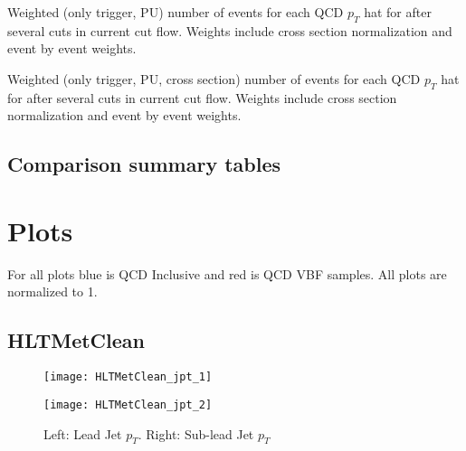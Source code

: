 \documentclass[a4paper,10pt]{article}
\begin{document}
\begin{table}[!h]
\centering
\resizebox{\linewidth}{!}{}
\caption{Weighted (only trigger, PU) number of events for each QCD $p_T$ hat for after several cuts in current cut flow. Weights include cross section normalization and event by event weights.}
\end{table}

\begin{table}[!h]
\centering
\resizebox{\linewidth}{!}{}
\caption{Weighted (only trigger, PU, cross section) number of events for each QCD $p_T$ hat for after several cuts in current cut flow. Weights include cross section normalization and event by event weights.}
\end{table}

\subsection{Comparison summary tables}

\begin{table}[!h]
\centering
\resizebox{\linewidth}{!}{}
\caption{}
\end{table}

\begin{table}[!h]
\centering
\resizebox{\linewidth}{!}{}
\caption{}
\end{table}

\begin{table}[!h]
\centering

\caption{}
\end{table}


\section{Plots}

For all plots blue is QCD Inclusive and red is QCD VBF samples. All plots are normalized to 1.

\clearpage
\subsection{HLTMetClean}

\begin{figure}[!h]
\centering
\begin{minipage}[!h]{0.4\linewidth}
\centering
\texttt{[image: HLTMetClean\_jpt\_1]}
\end{minipage}%
\begin{minipage}[!h]{0.4\linewidth}
  \texttt{[image: HLTMetClean\_jpt\_2]}
\end{minipage}
\caption{Left: Lead Jet $p_T$. Right: Sub-lead Jet $p_T$}
\end{figure}
\end{document}
